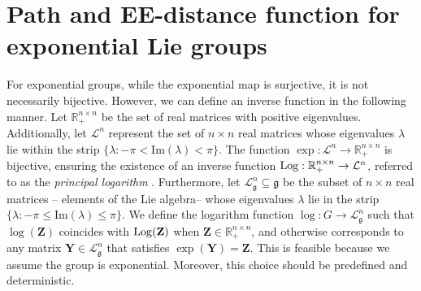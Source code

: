 \section{Path and EE-distance function for exponential Lie groups}\label{sec:kinematic-path-ee-dist-exp-group} %
For exponential groups, while the exponential map is surjective, it is not necessarily bijective. However, we can define an inverse function in the following manner. Let $\mathbb{R}_+^{n\times n}$ be the set of real matrices with positive eigenvalues. Additionally, let $\mathcal{L}^n$ represent the set of $n\times n$ real matrices whose eigenvalues $\lambda$ lie within the strip $\{\lambda : -\pi < \text{Im}(\lambda) < \pi\}$. The function $\exp:\mathcal{L}^n\to\mathbb{R}_+^{n\times n}$ is bijective, ensuring the existence of an inverse function $\operatorname{Log}: \mathbb{R}_+^{n\times n} \to \mathcal{L}^n$, referred to as the \emph{principal logarithm} \citep[p. 319]{Gallier2020}. Furthermore, let $\mathcal{L}_{\mathfrak{g}}^n\subseteq\mathfrak{g}$ be the subset of $n \times n$ real matrices -- elements of the Lie algebra-- whose eigenvalues $\lambda$ lie in the strip $\{\lambda : -\pi \le \text{Im}(\lambda) \le \pi\}$. We define the logarithm function $\log:G\to\mathcal{L}_{\mathfrak{g}}^n$ such that $\log(\mathbf{Z})$ coincides with $\operatorname{Log}(\mathbf{Z})$ when $\mathbf{Z}\in\mathbb{R}_+^{n\times n}$, and otherwise corresponds to any matrix $\mathbf{Y}\in\mathcal{L}_{\mathfrak{g}}^n$ that satisfies $\exp(\mathbf{Y}) = \mathbf{Z}$. This is feasible because we assume the group is exponential. Moreover, this choice should be predefined and deterministic.

